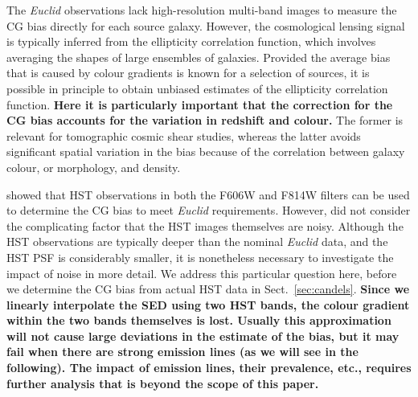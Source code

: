 \documentclass[useAMS,usenatbib]{mnras}
\begin{document}
The {\it Euclid} observations lack high-resolution multi-band images to measure the CG bias directly for each source galaxy. However, the cosmological lensing signal is typically inferred from the ellipticity correlation function, which involves  averaging the shapes of large ensembles of galaxies.
Provided the average bias that is caused by colour gradients is known for a selection of sources, it is possible in principle to obtain unbiased estimates of the ellipticity correlation function.
{\bf Here it is particularly important that the correction for the CG bias accounts for the variation in redshift and colour.}
The former is relevant for tomographic cosmic shear studies, whereas the latter avoids significant spatial variation in the bias because of the correlation between galaxy colour, or morphology, and density.

 showed that HST observations in both the F606W and F814W filters can be used to determine the CG bias to meet {\it Euclid} requirements. However,  did not consider the complicating factor that the HST images themselves are noisy. Although the HST observations are typically deeper than the nominal {\it Euclid} data, and the HST PSF is considerably smaller, it is nonetheless necessary to investigate the impact of noise in more detail. We address this particular question here, before we determine the CG bias from actual HST data in Sect.~\ref{sec:candels}.
{\bf Since we linearly interpolate the SED using two HST bands, the colour gradient within the two bands themselves is lost. Usually this approximation will not cause large deviations in the estimate of the bias, but it may fail when there are strong emission lines (as we will see in the following). The impact of emission lines, their prevalence, etc., requires further analysis that is beyond the scope of this paper.}
\end{document}
